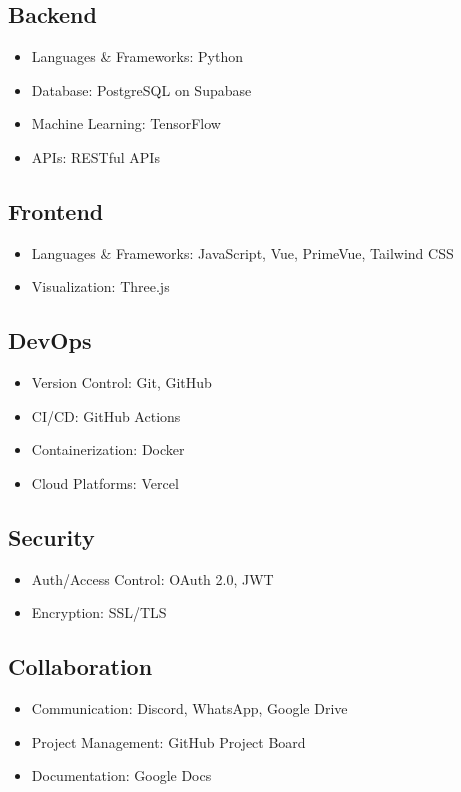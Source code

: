 \documentclass[a4paper,12pt]{article}
\begin{document}
\subsection{Backend}
\begin{itemize}
    \item Languages \& Frameworks: Python
    \item Database: PostgreSQL on Supabase
    \item Machine Learning: TensorFlow
    \item APIs: RESTful APIs
\end{itemize}

\subsection{Frontend}
\begin{itemize}
    \item Languages \& Frameworks: JavaScript, Vue, PrimeVue, Tailwind CSS
    \item Visualization: Three.js
\end{itemize}

\subsection{DevOps}
\begin{itemize}
    \item Version Control: Git, GitHub
    \item CI/CD: GitHub Actions
    \item Containerization: Docker
    \item Cloud Platforms: Vercel
\end{itemize}

\subsection{Security}
\begin{itemize}
    \item Auth/Access Control: OAuth 2.0, JWT
    \item Encryption: SSL/TLS
\end{itemize}

\subsection{Collaboration}
\begin{itemize}
    \item Communication: Discord, WhatsApp, Google Drive
    \item Project Management: GitHub Project Board
    \item Documentation: Google Docs
\end{itemize}
\end{document}
